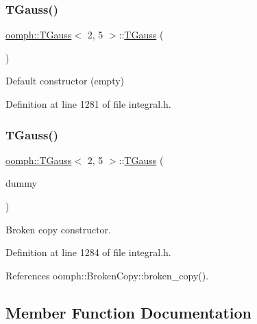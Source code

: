 \subsubsection{\texorpdfstring{T\+Gauss()}{TGauss()}\hspace{0.1cm}{\footnotesize\ttfamily [1/2]}}
{\footnotesize\ttfamily \hyperlink{classoomph_1_1TGauss}{oomph\+::\+T\+Gauss}$<$ 2, 5 $>$\+::\hyperlink{classoomph_1_1TGauss}{T\+Gauss} (\begin{DoxyParamCaption}{ }\end{DoxyParamCaption})\hspace{0.3cm}{\ttfamily [inline]}}



Default constructor (empty) 



Definition at line 1281 of file integral.\+h.

\mbox{\label{classoomph_1_1TGauss_3_012_00_015_01_4_a152bfa44873ef951adb1cd80f5843d85}} 
\subsubsection{\texorpdfstring{T\+Gauss()}{TGauss()}\hspace{0.1cm}{\footnotesize\ttfamily [2/2]}}
{\footnotesize\ttfamily \hyperlink{classoomph_1_1TGauss}{oomph\+::\+T\+Gauss}$<$ 2, 5 $>$\+::\hyperlink{classoomph_1_1TGauss}{T\+Gauss} (\begin{DoxyParamCaption}\item[{const \hyperlink{classoomph_1_1TGauss}{T\+Gauss}$<$ 2, 5 $>$ \&}]{dummy }\end{DoxyParamCaption})\hspace{0.3cm}{\ttfamily [inline]}}



Broken copy constructor. 



Definition at line 1284 of file integral.\+h.



References oomph\+::\+Broken\+Copy\+::broken\+\_\+copy().



\subsection{Member Function Documentation}
\mbox{\label{classoomph_1_1TGauss_3_012_00_015_01_4_a07a4aaf6bd454b904fcbaa6a6f94150d}} 
